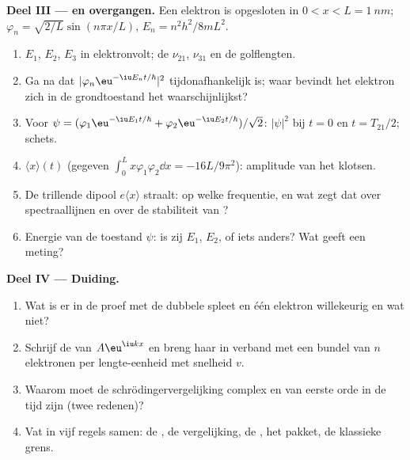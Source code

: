 \begin{problem}
\textbf{Deel III ---  en overgangen.}
Een elektron is opgesloten in $0 < x < L = \qty{1}{nm}$;
$\varphi_n =
\sqrt{2/L}\sin(n\pi x/L)$, $E_n = n^2h^2/8mL^2$.
\begin{enumerate}[resume]
  \item $E_1$, $E_2$, $E_3$ in elektronvolt; de 
        $\nu_{21}$, $\nu_{31}$ en de golflengten.
  \item Ga na dat $|\varphi_n\eu^{-\iu E_nt/\hbar}|^2$ tijdonafhankelijk is;
        waar bevindt het elektron zich in de grondtoestand het waarschijnlijkst?
  \item Voor
        $\psi = (\varphi_1\eu^{-\iu E_1t/\hbar} + \varphi_2\eu^{-\iu E_2t/\hbar})/
        \sqrt2$:
        $|\psi|^2$ bij $t = 0$ en $t = T_{21}/2$; schets.
  \item $\langle x\rangle(t)$ (gegeven
        $\int_0^Lx\varphi_1\varphi_2\dd x = -16L/9\pi^2$):
        amplitude van het klotsen.
  \item De trillende dipool $e\langle x\rangle$ straalt: op welke
        frequentie, en wat zegt dat over spectraallijnen en
        over de stabiliteit van ?
  \item Energie van de toestand $\psi$: is zij $E_1$, $E_2$, of iets
        anders? Wat geeft een meting?
\end{enumerate}

\textbf{Deel IV --- Duiding.}
\begin{enumerate}[resume]
  \item Wat is er in de proef met de dubbele spleet en één elektron willekeurig
        en wat niet?
  \item Schrijf de  van $A\eu^{\iu kx}$ en breng haar in verband met
        een bundel van $n$ elektronen per lengte-eenheid met snelheid $v$.
  \item Waarom moet de schrödingervergelijking complex en van eerste orde
        in de tijd zijn (twee redenen)?
  \item Vat in vijf regels samen: de , de vergelijking, de
        , het pakket, de klassieke grens.
\end{enumerate}
\end{problem}
